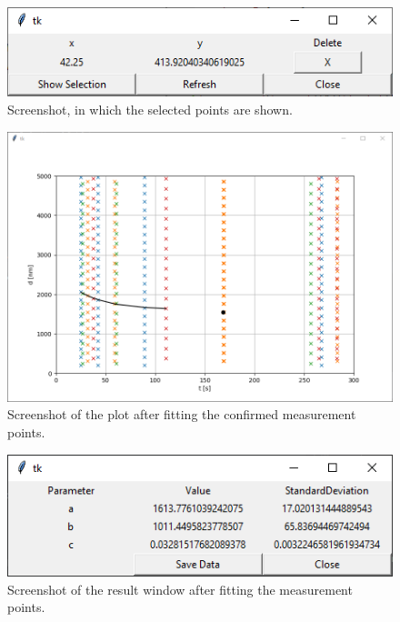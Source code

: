 \begin{figure}
	\centering
	\includegraphics[width=0.7\linewidth]{LamellaDevice_Evaluation/Evaluation_Selection}
	\caption{Screenshot, in which the selected points are shown.}
	\label{fig:evaluation_selection}
\end{figure}

\begin{figure}
	\centering
	\includegraphics[width=0.7\linewidth]{LamellaDevice_Evaluation/Evaluation_Fitted}
	\caption{Screenshot of the plot after fitting the confirmed measurement points. }
	\label{fig:evaluation_fitted}
\end{figure}

\begin{figure}
	\centering
	\includegraphics[width=0.7\linewidth]{LamellaDevice_Evaluation/Evaluation_Results}
	\caption{Screenshot of the result window after fitting the measurement points.}
	\label{fig:evaluation_results}
\end{figure}
